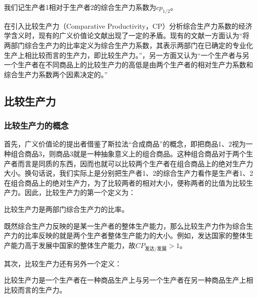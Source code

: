我们记生产者1相对于生产者2的综合生产力系数为$ cp_{1/2} $。

在引入比较生产力（Comparative Productivity，CP）分析综合生产力系数的经济学含义时，现有的广义价值论文献出现了一定的矛盾。现有的文献一方面认为“将两部门综合生产力的比率定义为综合生产力系数，其表示两部门在已确定的专业化生产上相比较而言的生产力，即比较生产力。”\cite[264]{CaiJiMingCongGuDianZhengZhiJingJiXueDaoZhongGuoTeSeSheHuiZhuYiZhengZhiJingJiXueJiYuZhongGuoShiJiaoDeZhengZhiJingJiXueYanBianShangCe2023}，另一方面又认为“一个生产者与另一个生产者在不同商品上的比较生产力的高低是由两个生产者的相对生产力系数和综合生产力系数两个因素决定的。”\cite[272]{CaiJiMingCongGuDianZhengZhiJingJiXueDaoZhongGuoTeSeSheHuiZhuYiZhengZhiJingJiXueJiYuZhongGuoShiJiaoDeZhengZhiJingJiXueYanBianShangCe2023}

\subsection{比较生产力}

\subsubsection{比较生产力的概念}

首先，广义价值论的提出者借鉴了斯拉法“合成商品”的概念，即把商品1、2视为一种组合商品3，则商品3就是一种抽象意义上的组合商品\cite[293]{CaiJiMingGuangYiJieZhiLun2001}。这种组合商品对于两个生产者而言是同质的东西，因而也就可以比较两个生产者在组合商品上的绝对生产力大小。换句话说，我们实际上是分别把生产者1、2的综合生产力看作是生产者1、2在组合商品上的绝对生产力，为了比较两者的相对大小，便称两者的比值为比较生产力。因此，比较生产力的第一个定义为：
\begin{definition}
    比较生产力是两部门综合生产力的比率\cite[71]{CaiJiMingCongXiaYiJieZhiLunDaoGuangYiJieZhiLunXiuDingBan2022}。
\end{definition}

既然综合生产力反映的是某一生产者的整体生产能力，那么比较生产力作为综合生产力的比率反映的就是两个生产者整体生产能力的大小。例如，发达国家的整体生产能力高于发展中国家的整体生产能力，故$ \mathit{CP}_{\text{发达}/\text{发展}} > 1 $。

其次，比较生产力还有另外一个定义：

\begin{definition}
    比较生产力是一个生产者在一种商品生产上与另一个生产者在另一种商品生产上相比较而言的生产力\cite[82]{CaiJiMingCongXiaYiJieZhiLunDaoGuangYiJieZhiLunXiuDingBan2022}。
\end{definition}

